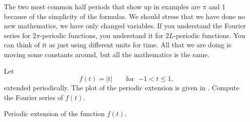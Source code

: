 \documentclass{ximera}
\begin{document}
The two most common half periods that show up in examples are $\pi$ and 1 because of the simplicity of the formulas.  We should stress that we have done no new mathematics, we have only changed variables.  If you understand the Fourier series for $2\pi$-periodic functions, you understand it for $2L$-periodic functions.  You can think of it as just using different units for time.  All that we are doing is moving some constants around, but all the mathematics is the same.

\begin{example}
    Let
    \begin{equation*}
    f(t) = \lvert t \rvert \qquad \text{for } \; {-1} < t \leq 1,
    \end{equation*}
    extended periodically.  The plot of the periodic extension is given in . Compute the Fourier series of $f(t)$.
    
    \begin{myfig}
        \capstart
        \caption{Periodic extension of the function $f(t)$.\label{gfs:sawcontfig}}
    \end{myfig}
\end{example}
\end{document}
